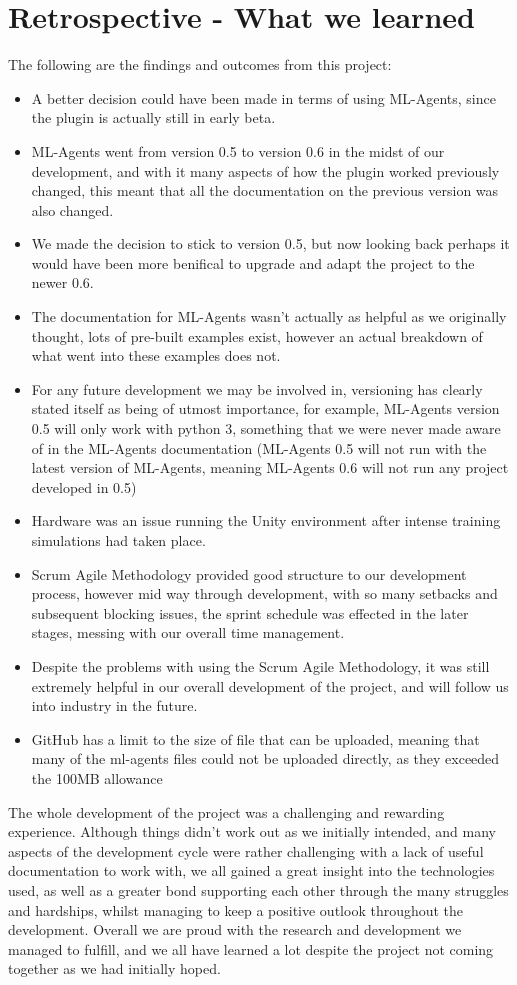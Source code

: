 \section{Retrospective - What we learned}
The following are the findings and outcomes from this project:
\begin{itemize}
    \item{A better decision could have been made in terms of using ML-Agents, since the plugin is actually still in early beta.}
    \item{ML-Agents went from version 0.5 to version 0.6 in the midst of our development, and with it many aspects of how the plugin worked previously changed, this meant that all the documentation on the previous version was also changed.}
	\item{We made the decision to stick to version 0.5, but now looking back perhaps it would have been more benifical to upgrade and adapt the project to the newer 0.6.}
    \item{The documentation for ML-Agents wasn't actually as helpful as we originally thought, lots of pre-built examples exist, however an actual breakdown of what went into these examples does not.}
    \item{For any future development we may be involved in, versioning has clearly stated itself as being of utmost importance, for example, ML-Agents version 0.5 will only work with python 3, something that we were never made aware of in the ML-Agents documentation (ML-Agents 0.5 will not run with the latest version of ML-Agents, meaning ML-Agents 0.6 will not run any project developed in 0.5)}
    \item{Hardware was an issue running the Unity environment after intense training simulations had taken place.}
    \item{Scrum Agile Methodology provided good structure to our development process, however mid way through development, with so many setbacks and subsequent blocking issues, the sprint schedule was effected in the later stages, messing with our overall time management.}
	\item{Despite the problems with using the Scrum Agile Methodology, it was still extremely helpful in our overall development of the project, and will follow us into industry in the future.}
    \item{GitHub has a limit to the size of file that can be uploaded, meaning that many of the ml-agents files could not be uploaded directly, as they exceeded the 100MB allowance}
\end{itemize}

The whole development of the project was a challenging and rewarding experience. Although things didn't work out as we initially intended, and many aspects of the development cycle were rather challenging with a lack of useful documentation to work with, we all gained a great insight into the technologies used, as well as a greater bond supporting each other through the many struggles and hardships, whilst managing to keep a positive outlook throughout the development. Overall we are proud with the research and development we managed to fulfill, and we all have learned a lot despite the project not coming together as we had initially hoped.
